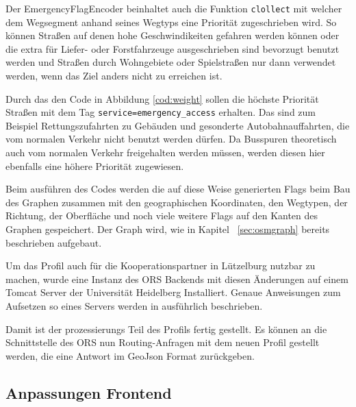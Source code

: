 \documentclass[12pt,a4paper]{article}
\begin{document}
Der EmergencyFlagEncoder beinhaltet auch die Funktion \lstinline!clollect! mit welcher dem Wegsegment anhand seines Wegtyps eine Priorität zugeschrieben wird. So können Straßen auf denen hohe Geschwindikeiten gefahren werden können oder die extra für Liefer- oder Forstfahrzeuge ausgeschrieben sind bevorzugt benutzt werden und Straßen durch Wohngebiete oder Spielstraßen nur dann verwendet werden, wenn das Ziel anders nicht zu erreichen ist.

Durch das den Code in Abbildung \ref{cod:weight} sollen die höchste Priorität Straßen mit dem Tag \lstinline!service=emergency_access! erhalten. Das sind zum Beispiel Rettungszufahrten zu Gebäuden und gesonderte Autobahnauffahrten, die vom normalen Verkehr nicht benutzt werden dürfen. Da Busspuren theoretisch auch vom normalen Verkehr freigehalten werden müssen, werden diesen hier ebenfalls eine höhere Priorität zugewiesen.

Beim ausführen des Codes werden die auf diese Weise generierten Flags beim Bau des Graphen zusammen mit den geographischen Koordinaten, den Wegtypen, der Richtung, der Oberfläche und noch viele weitere Flags auf den Kanten des Graphen gespeichert. Der Graph wird, wie in Kapitel ~\ref{sec:osmgraph} bereits beschrieben aufgebaut.

Um das Profil auch für die Kooperationspartner in Lützelburg nutzbar zu machen, wurde eine Instanz des ORS Backends mit diesen Änderungen auf einem Tomcat Server der Universität Heidelberg Installiert. Genaue Anweisungen zum Aufsetzen so eines Servers werden in \cite{neisdoktor} ausführlich beschrieben. 

Damit ist der prozessierungs  Teil des Profils fertig gestellt. Es können an die Schnittstelle des ORS nun Routing-Anfragen mit dem neuen Profil gestellt werden, die eine Antwort im GeoJson Format zurückgeben.

%
%
%
%

\subsection{Anpassungen Frontend}
\end{document}
